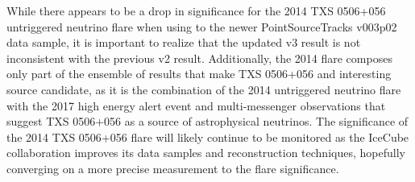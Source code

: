 While there appears to be a drop in significance for the 2014 TXS 0506+056 untriggered neutrino flare when using to the newer PointSourceTracks v003p02 data sample, it is important to realize that the updated v3 result is not inconsistent with the previous v2 result. Additionally, the 2014 flare composes only part of the ensemble of results that make TXS 0506+056 and interesting source candidate, as it is the combination of the 2014 untriggered neutrino flare with the 2017 high energy alert event and multi-messenger observations that suggest TXS 0506+056 as a source of astrophysical neutrinos. The significance of the 2014 TXS 0506+056 flare will likely continue to be monitored as the IceCube collaboration improves its data samples and reconstruction techniques, hopefully converging on a more precise measurement to the flare significance. 


